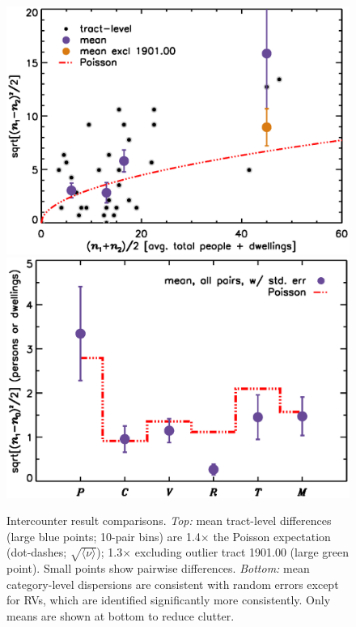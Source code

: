 \documentclass[11pt,twocolumn]{article}
\begin{document}
\begin{figure}[t]
\centering
	\includegraphics[width=\linewidth, trim = 1cm 0cm 0cm 0cm]{intDupeChar}\\
	\includegraphics[width=\linewidth, trim = 1cm 0.5cm 0cm 0cm]{catDupeChar}
\caption{Intercounter result comparisons. {\it Top:} mean tract-level differences (large blue 
		points; 10-pair bins) are 1.4$\times$ the Poisson expectation (dot-dashes; 
		$\sqrt{\langle\nu\rangle}$); 1.3$\times$ excluding outlier tract 1901.00 (large green 
		point). Small points show pairwise differences. {\it Bottom:} mean category-level 
		dispersions are consistent with random errors except for RVs, which are identified 
		significantly more consistently. Only means are shown at bottom to reduce clutter.}
\label{fig:dupeChar}
\end{figure}
\end{document}
